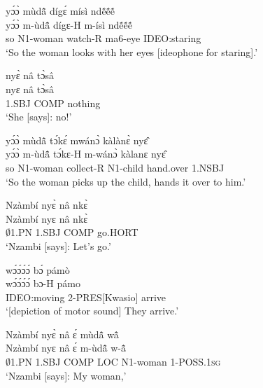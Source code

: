 \begin{exe} 
\exN\label{81}
  \glll yɔ́ɔ̀ mùdã̂ dígɛ́ mísì ndẽ́ẽ́ẽ́ \\
        yɔ́ɔ̀ m-ùdã̂ dígɛ-H m-ísì ndẽ́ẽ́ẽ́ \\
        so N1-woman watch-R ma6-eye IDEO:staring \\
    \trans `So the woman looks with her eyes [ideophone for staring].'
\end{exe}

\begin{exe} 
\exN\label{82}
  \glll nyɛ̀ nâ tɔ̀sâ \\
          nyɛ nâ tɔ̀sâ \\
       1.SBJ COMP nothing  \\
    \trans `She [says]: no!'
\end{exe}

\begin{exe} 
\exN\label{83}
  \glll yɔ́ɔ̀ mùdã̂ tɔ́kɛ́ mwánɔ̀ kàlànɛ̀ nyɛ̂ \\
       yɔ́ɔ̀ m-ùdã̂ tɔ́kɛ-H m-wánɔ̀ kàlanɛ nyɛ̂ \\
       so N1-woman collect-R N1-child hand.over 1.NSBJ\\
    \trans `So the woman picks up the child, hands it over to him.'
\end{exe}

\begin{exe} 
\exN\label{84}
  \glll Nzàmbí nyɛ̀ nâ nkɛ̀ \\
        Nzàmbí nyɛ nâ nkɛ̀ \\
       $\emptyset$1.PN 1.SBJ COMP go.HORT  \\
    \trans `Nzambi [says]: Let's go.'
\end{exe}

\begin{exe} 
\exN\label{85}
  \glll wɔ́ɔ́ɔ́ɔ́ bɔ́ pámò \\
        wɔ́ɔ́ɔ́ɔ́ bɔ-H pámo \\
       IDEO:moving 2-PRES[Kwasio] arrive  \\
    \trans `[depiction of motor sound] They arrive.'
\end{exe}

\begin{exe} 
\exN\label{86}
  \glll Nzàmbí nyɛ̀ nâ ɛ́ mùdã̂ wã̂ \\
        Nzàmbí nyɛ nâ ɛ́ m-ùdã̂ w-ã̂ \\
       $\emptyset$1.PN 1.SBJ COMP LOC N1-woman 1-POSS.1\textsc{sg}  \\
    \trans `Nzambi [says]: My woman,'
\end{exe}

